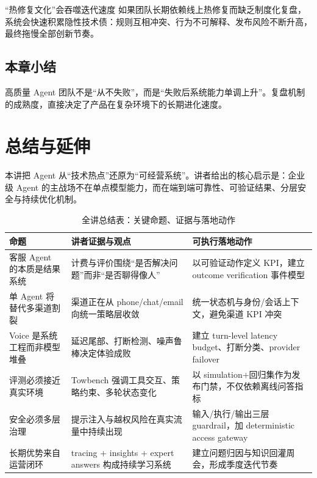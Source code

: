 \documentclass[a4paper]{article}
\begin{document}
\begin{warningbox}{“热修复文化”会吞噬迭代速度}
如果团队长期依赖线上热修复而缺乏制度化复盘，系统会快速积累隐性技术债：规则互相冲突、行为不可解释、发布风险不断升高，最终拖慢全部创新节奏。
\end{warningbox}

\subsection{本章小结}

高质量 Agent 团队不是“从不失败”，而是“失败后系统能力单调上升”。复盘机制的成熟度，直接决定了产品在复杂环境下的长期进化速度。

\section{总结与延伸}

本讲把 Agent 从“技术热点”还原为“可经营系统”。讲者给出的核心启示是：企业级 Agent 的主战场不在单点模型能力，而在端到端可靠性、可验证结果、分层安全与持续优化机制。

\begin{table}[H]
\centering
\caption{全讲总结表：关键命题、证据与落地动作}
\begin{tabularx}{\textwidth}{>{\raggedright\arraybackslash}p{3.1cm} >{\raggedright\arraybackslash}X >{\raggedright\arraybackslash}p{4.2cm}}
\toprule
命题 & 讲者证据与观点 & 可执行落地动作 \\
\midrule
客服 Agent 的本质是结果系统 & 计费与评价围绕“是否解决问题”而非“是否聊得像人” & 以可验证动作定义 KPI，建立 outcome verification 事件模型 \\
单 Agent 将替代多渠道割裂 & 渠道正在从 phone/chat/email 向统一策略层收敛 & 统一状态机与身份/会话上下文，避免渠道 KPI 冲突 \\
Voice 是系统工程而非模型堆叠 & 延迟尾部、打断检测、噪声鲁棒决定体验成败 & 建立 turn-level latency budget、打断分类、provider failover \\
评测必须接近真实环境 & Towbench 强调工具交互、策略约束、多轮状态变化 & 以 simulation+回归集作为发布门禁，不仅依赖离线问答指标 \\
安全必须多层治理 & 提示注入与越权风险在真实流量中持续出现 & 输入/执行/输出三层 guardrail，加 deterministic access gateway \\
长期优势来自运营闭环 & tracing + insights + expert answers 构成持续学习系统 & 建立问题归因与知识回灌周会，形成季度迭代节奏 \\
\bottomrule
\end{tabularx}
\end{table}
\end{document}
